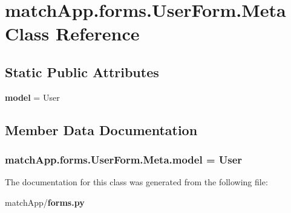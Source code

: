 \section{match\+App.\+forms.\+User\+Form.\+Meta Class Reference}
\label{classmatch_app_1_1forms_1_1_user_form_1_1_meta}
\subsection*{Static Public Attributes}
\begin{DoxyCompactItemize}
\item 
{\bf model} = User
\end{DoxyCompactItemize}


\subsection{Member Data Documentation}
\subsubsection[{model}]{\setlength{\rightskip}{0pt plus 5cm}match\+App.\+forms.\+User\+Form.\+Meta.\+model = User\hspace{0.3cm}{\ttfamily [static]}}\label{classmatch_app_1_1forms_1_1_user_form_1_1_meta_a5d9648ab073e418b0cfa6b4883c32423}


The documentation for this class was generated from the following file\+:\begin{DoxyCompactItemize}
\item 
match\+App/{\bf forms.\+py}\end{DoxyCompactItemize}
